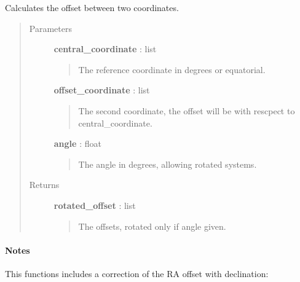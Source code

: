 \documentclass[a4paper,10pt,english]{sphinxmanual}
\begin{document}
\begin{fulllineitems}
\label{functions:astrolyze.functions.astro_functions.calc_offset}
Calculates the offset between two coordinates.
\begin{quote}\begin{description}
\item[{Parameters }] \leavevmode
\textbf{central\_coordinate} : list
\begin{quote}

The reference coordinate in degrees or equatorial.
\end{quote}

\textbf{offset\_coordinate} : list
\begin{quote}

The second coordinate, the offset will be with rescpect to
central\_coordinate.
\end{quote}

\textbf{angle} : float
\begin{quote}

The angle in degrees, allowing rotated systems.
\end{quote}

\item[{Returns }] \leavevmode
\textbf{rotated\_offset} : list
\begin{quote}

The offsets, rotated only if angle given.
\end{quote}

\end{description}\end{quote}
\paragraph{Notes}

This functions includes a correction of the RA offset with declination:

\end{fulllineitems}

\end{document}
